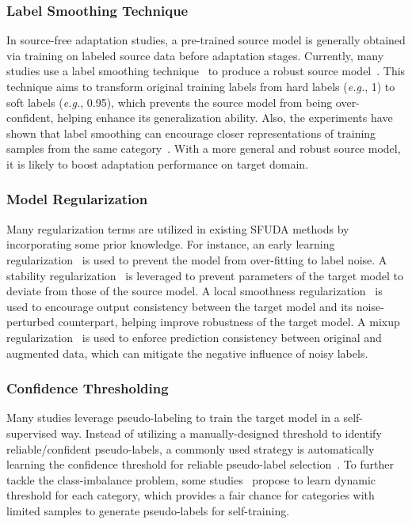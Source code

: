 \documentclass[10pt,journal,compsoc]{IEEEtran}
\def\eg{{\em e.g.}}
\begin{document}
\subsubsection{Label Smoothing Technique}
In source-free adaptation studies, a pre-trained source model is generally obtained via training on labeled source data before adaptation stages.
Currently, many studies use a label smoothing technique~\cite{muller2019does, szegedy2016rethinking} to produce a robust source model~\cite{liang2020we, wang2022exploring, yang2021exploiting, ding2022proxymix, li2022sourcemd, chen2022source}.
This technique aims to transform original training labels from hard labels (\eg, 1) to soft labels (\eg, 0.95), which prevents the source model from being over-confident, helping enhance its generalization ability.
Also, the experiments have shown that label smoothing can encourage closer representations of training samples from the same category~\cite{muller2019does}.
With a more general and robust source model, it is likely to boost adaptation performance on target domain.

\subsubsection{Model Regularization}
Many regularization terms are utilized in existing SFUDA methods by incorporating some prior knowledge. 
For instance, an early learning regularization~\cite{qiu2021source, xu2022sourceelr, arpit2017closer} is used to prevent the model from over-fitting to label noise.
A stability regularization~\cite{li2020model, yan2021augmented, yang2022sourceself, xiong2022source} is leveraged to prevent parameters of the target model to deviate from those of the source model.
A local smoothness regularization~\cite{li2020model, ma2021semi} is used to encourage output consistency between the target model and its noise-perturbed counterpart, helping improve robustness of the target model.
A mixup regularization~\cite{liang2022dine, ding2022proxymix, guan2022polycentric, peng2022toward, kundu2022balancing} is used to enforce prediction consistency between original and augmented data, which can mitigate the negative influence of noisy labels. 


\subsubsection{Confidence Thresholding}
Many studies leverage pseudo-labeling to train the target model in a self-supervised way.
Instead of utilizing a manually-designed threshold to identify reliable/confident pseudo-labels, a commonly used strategy is automatically learning the confidence threshold for reliable pseudo-label selection~\cite{li2022adaptive}.
To further tackle the class-imbalance problem, some studies~\cite{yang2022sourceself, kim2021domain, fleuret2021uncertainty, xu2022denoising, prabhu2021s4t} propose to learn dynamic threshold for each category, %
which provides a fair chance for categories with limited samples to generate pseudo-labels for self-training.
\end{document}
